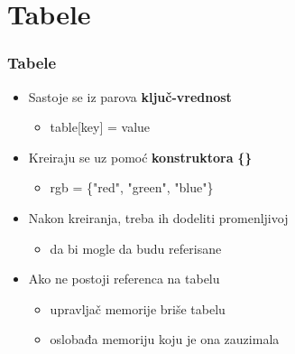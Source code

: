 \documentclass{beamer}
\begin{document}
\section{Tabele}
\begin{frame}
\frametitle{Tabele}
\begin{itemize}
\item Sastoje se iz parova \textbf{ključ-vrednost}
\begin{itemize}
\item \begin{semiverbatim} table[key] = value \end{semiverbatim}
\end{itemize}
\item Kreiraju se uz pomoć \textbf{konstruktora} \textbf{\{\}}
\begin{itemize}
\item \begin{semiverbatim} rgb = \{"red", "green", "blue"\} \end{semiverbatim}
\end{itemize}
\item Nakon kreiranja, treba ih dodeliti promenljivoj
\begin{itemize}
\item da bi mogle da budu referisane
\end{itemize}
\item Ako ne postoji referenca na tabelu
\begin{itemize}
\item upravljač memorije briše tabelu
\item oslobađa memoriju koju je ona zauzimala
\end{itemize}
\end{itemize}
\end{frame}

\end{document}

